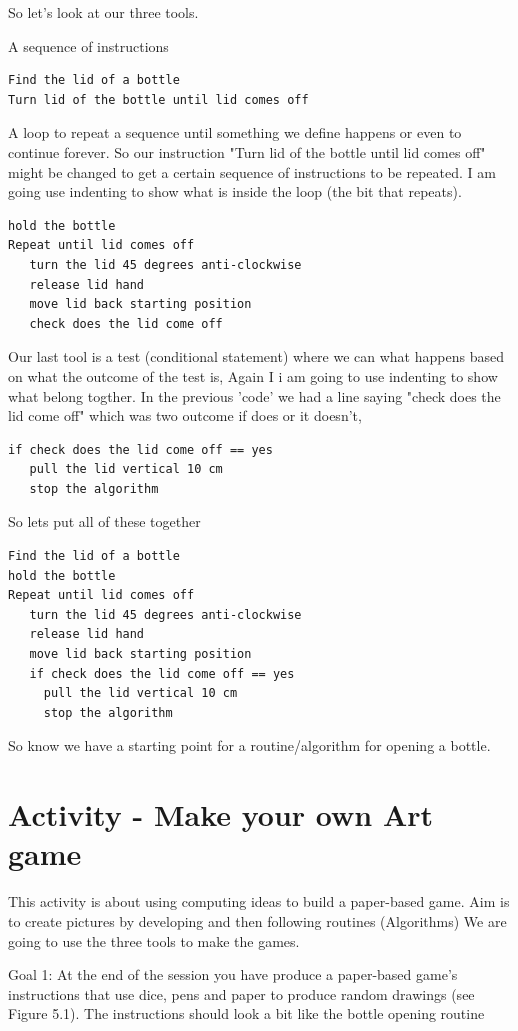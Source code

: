 So let's look at our three tools.

A sequence of instructions
\begin{lstlisting}
Find the lid of a bottle
Turn lid of the bottle until lid comes off
\end{lstlisting}

A loop to repeat a sequence until something we define happens or even to continue forever. So our instruction "Turn lid of the bottle until lid comes off" might be changed to get a certain sequence of instructions to be repeated. I am going use indenting to show what is inside the loop (the bit that repeats).
\begin{lstlisting}
hold the bottle
Repeat until lid comes off
   turn the lid 45 degrees anti-clockwise
   release lid hand 
   move lid back starting position
   check does the lid come off
\end{lstlisting}

Our last tool is a test (conditional statement) where we can what happens based on what the outcome of the test is, Again I i am going to use indenting to show what belong togther. In the previous 'code' we had a line saying "check does the lid come off" which was two outcome if does or it doesn't,

\begin{lstlisting}
if check does the lid come off == yes
   pull the lid vertical 10 cm
   stop the algorithm
\end{lstlisting}

So lets put all of these together
\begin{lstlisting}
Find the lid of a bottle
hold the bottle
Repeat until lid comes off
   turn the lid 45 degrees anti-clockwise
   release lid hand 
   move lid back starting position
   if check does the lid come off == yes
     pull the lid vertical 10 cm
     stop the algorithm
\end{lstlisting}

So know we have a starting point for a routine/algorithm for opening a bottle. 

\section{Activity - Make your own Art game}
This activity is about using computing ideas to build a paper-based game. Aim is to create pictures by developing and then following routines (Algorithms) We are going to use the three tools to make the games. 

Goal 1: At the end of the session you have produce a paper-based game's instructions that use dice, pens and paper to produce random drawings (see Figure 5.1). The instructions should look a bit like the bottle opening routine 

